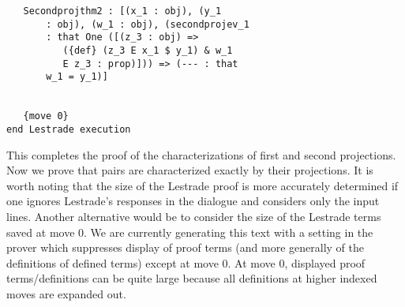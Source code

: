 \documentclass[12pt]{article}
\begin{document}
\begin{verbatim}
   Secondprojthm2 : [(x_1 : obj), (y_1 
       : obj), (w_1 : obj), (secondprojev_1 
       : that One ([(z_3 : obj) => 
          ({def} (z_3 E x_1 $ y_1) & w_1 
          E z_3 : prop)])) => (--- : that 
       w_1 = y_1)]


   {move 0}
end Lestrade execution
\end{verbatim}

This completes the proof of the characterizations of first and second projections.  Now we prove that pairs are characterized exactly by their projections.  It is worth noting that
the size of the Lestrade proof is more accurately determined if one ignores Lestrade's responses in the dialogue and considers only the input lines.  Another alternative would be to consider the size of the Lestrade terms saved at move 0.  We are currently generating this text with a setting in the prover which suppresses display of proof terms
(and more generally of the definitions of defined terms) except at move 0.  At move 0, displayed proof terms/definitions can be quite large because all definitions at higher indexed moves are expanded out.
\end{document}

